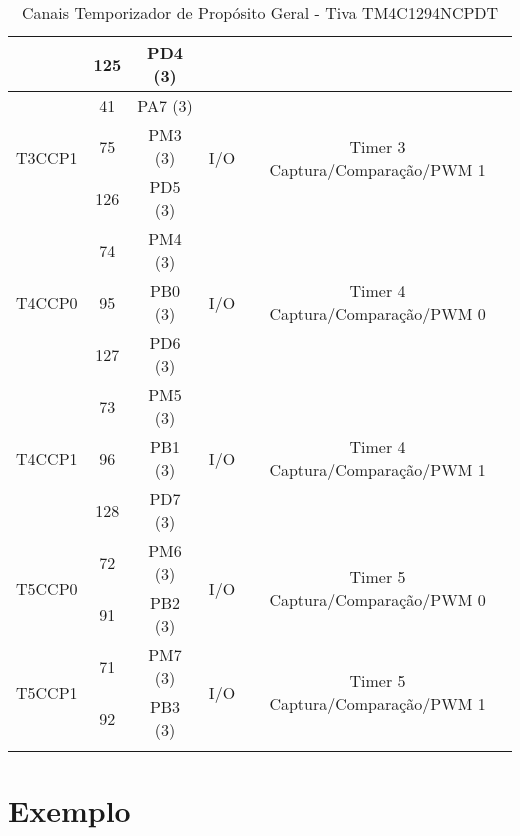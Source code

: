 \begin{center}
\begin{longtable}{|c|c|c|c|c|}
		& 125 & PD4 (3) &     &                                 \\ \hline
		\multirow{3}{*}{T3CCP1}    & 41  & PA7 (3) & \multirow{3}{*}{I/O} & \multirow{3}{*}{Timer 3 Captura/Comparação/PWM 1}\\
		& 75  & PM3 (3) &     &                                 \\ 
		& 126 & PD5 (3) &     &                                 \\ \hline
		\multirow{3}{*}{T4CCP0}    & 74  & PM4 (3) & \multirow{3}{*}{I/O} & \multirow{3}{*}{Timer 4 Captura/Comparação/PWM 0}\\
		& 95  & PB0 (3) &     &                                 \\ 
		& 127 & PD6 (3) &     &                                 \\ \hline
		\multirow{3}{*}{T4CCP1}    & 73  & PM5 (3) & \multirow{3}{*}{I/O} & \multirow{3}{*}{Timer 4 Captura/Comparação/PWM 1}\\
		& 96  & PB1 (3) &     &                                 \\ 
		& 128 & PD7 (3) &     &                                 \\ \hline
		\multirow{2}{*}{T5CCP0}    & 72  & PM6 (3) & \multirow{2}{*}{I/O} & \multirow{2}{*}{Timer 5 Captura/Comparação/PWM 0}\\
		& 91  & PB2 (3) &     &                                 \\ \hline
		\multirow{2}{*}{T5CCP1}    & 71  & PM7 (3) & \multirow{2}{*}{I/O} & \multirow{2}{*}{Timer 5 Captura/Comparação/PWM 1}\\
		& 92  & PB3 (3) &     &                                 \\ \hline
		\caption{Canais Temporizador de Propósito Geral - Tiva TM4C1294NCPDT \cite{DATASHEET_TIVA} }
		\label{tab:CanaisTimer}
	\end{longtable}
\end{center}



\section{Exemplo}